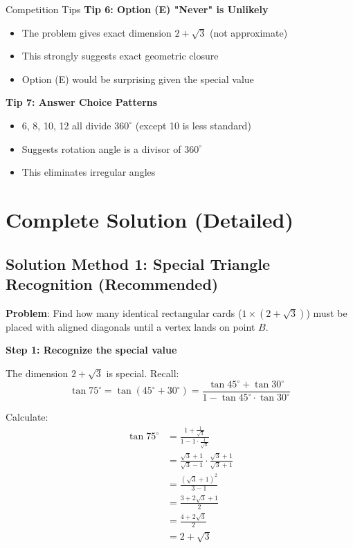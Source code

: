 \documentclass[12pt]{article}
\begin{document}
\begin{protipbox}{Competition Tips}
\textbf{Tip 6: Option (E) "Never" is Unlikely}
\begin{itemize}
    \item The problem gives exact dimension $2+\sqrt{3}$ (not approximate)
    \item This strongly suggests exact geometric closure
    \item Option (E) would be surprising given the special value
\end{itemize}

\textbf{Tip 7: Answer Choice Patterns}
\begin{itemize}
    \item 6, 8, 10, 12 all divide $360^\circ$ (except 10 is less standard)
    \item Suggests rotation angle is a divisor of $360^\circ$
    \item This eliminates irregular angles
\end{itemize}

\end{protipbox}

\section*{Complete Solution (Detailed)}

\subsection*{Solution Method 1: Special Triangle Recognition (Recommended)}

\textbf{Problem}: Find how many identical rectangular cards ($1 \times (2+\sqrt{3})$) must be placed with aligned diagonals until a vertex lands on point $B$.

\textbf{Step 1: Recognize the special value}

The dimension $2+\sqrt{3}$ is special. Recall:
\[\tan 75^\circ = \tan(45^\circ + 30^\circ) = \frac{\tan 45^\circ + \tan 30^\circ}{1 - \tan 45^\circ \cdot \tan 30^\circ}\]

Calculate:
\begin{align*}
\tan 75^\circ &= \frac{1 + \frac{1}{\sqrt{3}}}{1 - 1 \cdot \frac{1}{\sqrt{3}}}\\
&= \frac{\sqrt{3} + 1}{\sqrt{3} - 1} \cdot \frac{\sqrt{3}+1}{\sqrt{3}+1}\\
&= \frac{(\sqrt{3}+1)^2}{3-1}\\
&= \frac{3 + 2\sqrt{3} + 1}{2}\\
&= \frac{4 + 2\sqrt{3}}{2}\\
&= 2 + \sqrt{3}
\end{align*}
\end{document}
